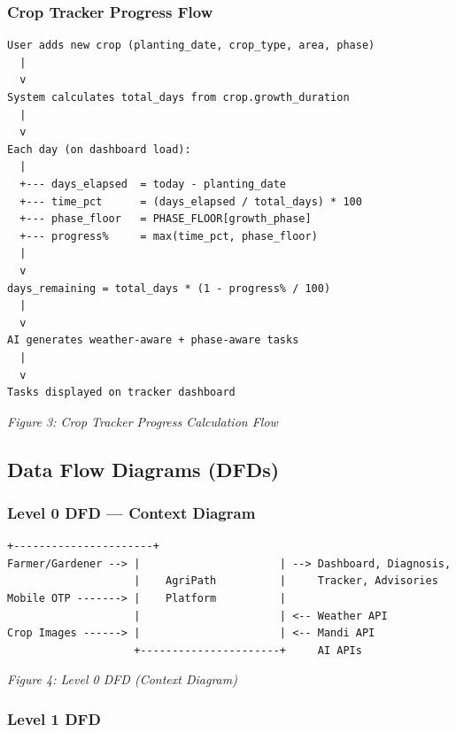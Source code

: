 \documentclass[12pt,a4paper]{article}
\begin{document}
\subsubsection*{Crop Tracker Progress Flow}

\begin{Verbatim}[fontsize=\small, frame=single]
User adds new crop (planting_date, crop_type, area, phase)
  |
  v
System calculates total_days from crop.growth_duration
  |
  v
Each day (on dashboard load):
  |
  +--- days_elapsed  = today - planting_date
  +--- time_pct      = (days_elapsed / total_days) * 100
  +--- phase_floor   = PHASE_FLOOR[growth_phase]
  +--- progress%     = max(time_pct, phase_floor)
  |
  v
days_remaining = total_days * (1 - progress% / 100)
  |
  v
AI generates weather-aware + phase-aware tasks
  |
  v
Tasks displayed on tracker dashboard
\end{Verbatim}
\begin{center}
\textit{Figure 3: Crop Tracker Progress Calculation Flow}
\end{center}

\subsection{Data Flow Diagrams (DFDs)}

\subsubsection*{Level 0 DFD --- Context Diagram}

\begin{Verbatim}[fontsize=\small, frame=single]
                    +----------------------+
Farmer/Gardener --> |                      | --> Dashboard, Diagnosis,
                    |    AgriPath          |     Tracker, Advisories
Mobile OTP -------> |    Platform          |
                    |                      | <-- Weather API
Crop Images ------> |                      | <-- Mandi API
                    +----------------------+     AI APIs
\end{Verbatim}
\begin{center}
\textit{Figure 4: Level 0 DFD (Context Diagram)}
\end{center}

\subsubsection*{Level 1 DFD}
\end{document}
